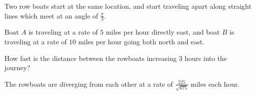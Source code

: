 \documentclass{ximera}
\author{Steven Gubkin}
\begin{document}
\begin{exercise}



        	Two row boats start at the same location, and start traveling apart along straight lines which meet at an angle of $\frac{\pi}{3}$.

        	Boat $A$ is traveling at a rate of $5$ miles per hour directly east, and boat $B$ is traveling at a rate of $10$ miles per hour going both north and east.

	How fast is the distance between the rowboats increasing $3$ hours into the journey? 

\begin{prompt}
	The rowboats are diverging from each other at a rate of $\frac{225}{\sqrt{675}}$ miles each hour.
\end{prompt}

\end{exercise}
\end{document}
